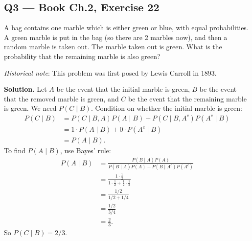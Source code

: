 \documentclass[11pt]{article}
\begin{document}
\subsection*{Q3 --- Book Ch.2, Exercise 22}
\begin{qbox}
A bag contains one marble which is either green or blue, with equal probabilities. A green marble is put in the bag (so there are 2 marbles now), and then a random marble is taken out. The marble taken out is green. What is the probability that the remaining marble is also green?

\textit{Historical note}: This problem was first posed by Lewis Carroll in 1893.
\end{qbox}
\textbf{Solution.} Let $A$ be the event that the initial marble is green, $B$ be the event that the removed marble is green, and $C$ be the event that the remaining marble is green. We need $P(C\mid B)$. Condition on whether the initial marble is green:
\begin{align*}
P(C\mid B) &= P(C\mid B,A)P(A\mid B) + P(C\mid B, A^c)P(A^c\mid B) \\
&= 1\cdot P(A\mid B) + 0 \cdot P(A^c\mid B) \\
&= P(A\mid B).
\end{align*}
To find $P(A\mid B)$, use Bayes' rule:
\begin{align*}
P(A\mid B) &= \frac{P(B\mid A)P(A)}{P(B\mid A)P(A) + P(B\mid A^c)P(A^c)} \\
&= \frac{1 \cdot \tfrac{1}{2}}{1\cdot \tfrac12 + \tfrac12 \cdot \tfrac12} \\
&= \frac{1/2}{1/2 + 1/4} \\
&= \frac{1/2}{3/4} \\
&= \frac{2}{3}.
\end{align*}
So $P(C\mid B) = 2/3$.
\end{document}
